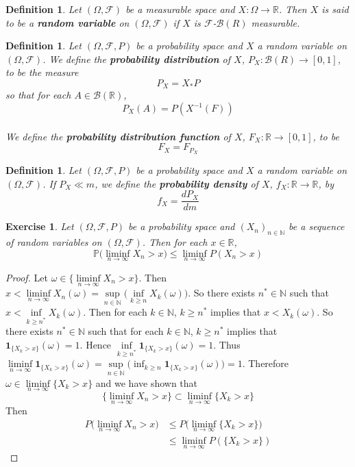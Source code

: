 \documentclass[12pt]{amsart}
\newtheorem{defn}[thm]{Definition}
\newtheorem{ex}[thm]{Exercise}
\newcommand{\om}{\omega}
\newcommand{\Om}{\Omega}
\newcommand{\N}{\mathbb{N}}
\newcommand{\R}{\mathbb{R}}
\renewcommand{\P}{\mathbb{P}}
\newcommand{\MB}{\mathcal{B}}
\newcommand{\MF}{\mathcal{F}}
\begin{document}
\begin{defn}
	Let $(\Om, \MF)$ be a measurable space and $X:\Om \rightarrow \R$. Then $X$ is said to be a \textbf{random variable} on $(\Om, \MF)$ if $X$ is $\MF$-$\MB(R)$ measurable. 
\end{defn}

\begin{defn}
	Let $(\Om, \MF, P)$ be a probability space and $X$ a random variable on $(\Om,\MF)$. We define the \textbf{probability distribution} of $X$, $P_X:\MB(R) \rightarrow [0,1]$, to be the measure $$P_X = X_*P$$ so that for each $A \in \MB(\R)$, $$P_X(A) = P(X^{-1}(F))$$ \\ We define the \textbf{probability distribution function} of $X$, $F_X:\R \rightarrow [0,1]$, to be $$F_X = F_{P_X}$$
\end{defn}

\begin{defn}
	Let $(\Om, \MF, P)$ be a probability space and $X$ a random variable on $(\Om,\MF)$. If $P_X \ll m$, we define the \textbf{probability density} of $X$, $f_X: \R \rightarrow \R$, by $$f_X = \frac{dP_X}{dm}$$ 
\end{defn}

\begin{ex}
	Let $(\Om, \MF, P)$ be a probability space and $(X_n)_{n \in \N}$ be a sequence of random variables on $(\Om, \MF)$. Then for each $x \in \R$, $$\P\bigg(\liminf_{n \rightarrow \infty}X_n > x\bigg) \leq \liminf_{n \rightarrow \infty} P(X_n > x)$$  
\end{ex}

\begin{proof}
	Let $\om \in \bigg \{ \liminf\limits_{n \rightarrow \infty} X_n > x \bigg \}$. Then $x< \liminf\limits_{n \rightarrow \infty} X_n (\om) = \sup\limits_{n \in \N} \bigg( \inf\limits_{k \geq n} X_k(\om)\bigg)$. So there exists $n^* \in \N$ such that $x< \inf\limits_{k \geq n^*} X_k(\om)$. Then for each $k \in \N$, $k \geq n^*$ implies that $x < X_k(\om)$. So there exists $n^* \in \N$ such that for each $k \in \N$, $k \geq n^*$ implies that $\mathbf{1}_{\{X_k > x\}}(\om) =1$. Hence $\inf\limits_{k \geq n^*} \mathbf{1}_{\{X_k > x\}}(\om)  = 1$. Thus  $\liminf\limits_{n \rightarrow \infty} \mathbf{1}_{\{X_k > x\}}(\om) = \sup\limits_{n \in \N} \bigg( \inf_{k \geq n} \mathbf{1}_{\{X_k > x\}}(\om) \bigg) = 1$. Therefore $\om \in \liminf\limits_{n \rightarrow \infty} \{X_k > x\}$ and we have shown that $$\bigg \{ \liminf\limits_{n \rightarrow \infty} X_n > x \bigg \} \subset \liminf\limits_{n \rightarrow \infty} \{X_k > x\}$$ Then 
	\begin{align*}
		P \bigg( \liminf\limits_{n \rightarrow \infty} X_n > x \bigg)
		& \leq P \bigg( \liminf\limits_{n \rightarrow \infty} \{X_k > x\} \bigg) \\
		& \leq \liminf_{n \rightarrow \infty} P(\{X_k > x\})
	\end{align*}
\end{proof}
\end{document}
